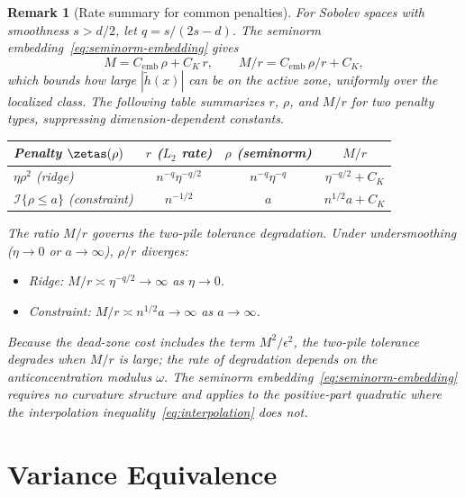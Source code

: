 \documentclass{article}
\newtheorem{remark}{Remark}[section]
\begin{document}
\begin{remark}[Rate summary for common penalties]
\label{rmk:rate-table}
For Sobolev spaces with smoothness $s > d/2$, let $q = s/(2s-d)$.
The seminorm embedding~\eqref{eq:seminorm-embedding} gives
\[
M = C_{\mathrm{emb}}\,\rho + C_K\, r,
\qquad
M/r = C_{\mathrm{emb}}\,\rho/r + C_K,
\]
which bounds how large $|\tilde h(x)|$ can be on the active zone, uniformly over the localized class. The following table summarizes $r$, $\rho$, and $M/r$ for two penalty types, suppressing dimension-dependent constants.

\begin{center}
\begin{tabular}{lccc}
\hline
\textbf{Penalty} $\zetas(\rho)$ & $r$ ($L_2$ rate) & $\rho$ (seminorm) & $M/r$ \\
\hline
$\eta \rho^2$ (ridge) & $n^{-q} \eta^{-q/2}$ & $n^{-q} \eta^{-q}$ & $\eta^{-q/2} + C_K$ \\[0.5em]
$\mathcal{I}\{\rho \le a\}$ (constraint) & $n^{-1/2}$ & $a$ & $n^{1/2} a + C_K$ \\
\hline
\end{tabular}
\end{center}

\noindent The ratio $M/r$ governs the two-pile tolerance degradation. Under \emph{undersmoothing} ($\eta \to 0$ or $a \to \infty$), $\rho/r$ diverges:
\begin{itemize}
\item \emph{Ridge}: $M/r \asymp \eta^{-q/2} \to \infty$ as $\eta \to 0$.
\item \emph{Constraint}: $M/r \asymp n^{1/2} a \to \infty$ as $a \to \infty$.
\end{itemize}
Because the dead-zone cost includes the term $M^2/\epsilon^2$, the two-pile tolerance degrades when $M/r$ is large; the rate of degradation depends on the anticoncentration modulus $\omega$. The seminorm embedding~\eqref{eq:seminorm-embedding} requires no curvature structure and applies to the positive-part quadratic where the interpolation inequality~\eqref{eq:interpolation} does not.
\end{remark}



\section{Variance Equivalence}
\label{sec:variance-equiv}
\end{document}
